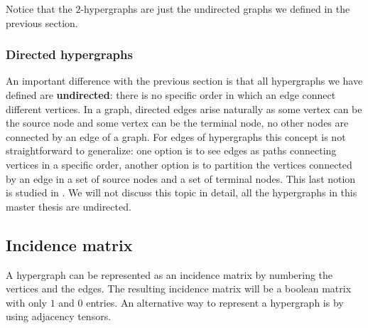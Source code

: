 \documentclass[a4paper,11pt]{report}
\begin{document}
Notice that the $2$-hypergraphs are just the undirected graphs we defined in the previous 
section.



\subsubsection{Directed hypergraphs}
An important difference with the previous section is that all hypergraphs we 
have defined are \textbf{undirected}: there is no specific order in which an 
edge connect different vertices. In a graph, directed edges arise naturally as 
some vertex can be the source node and some vertex can be the terminal node, no other nodes
are connected by an edge of a graph. For edges of hypergraphs this concept is not straightforward to generalize: one option is to see 
edges as paths connecting vertices in a specific order,
 another option is to partition the vertices connected by an edge in a set of source 
 nodes and a set of terminal nodes. This last notion is 
studied in \cite{gallo}. We will not discuss this topic in detail, all the 
hypergraphs in this master thesis are undirected.


\subsection{Incidence matrix}
A hypergraph can be represented as an incidence matrix by numbering the vertices 
and the edges. The resulting incidence matrix will be a boolean matrix with only 
$1$ and $0$ entries. An alternative way to represent a hypergraph is by using
adjacency tensors.
\end{document}
